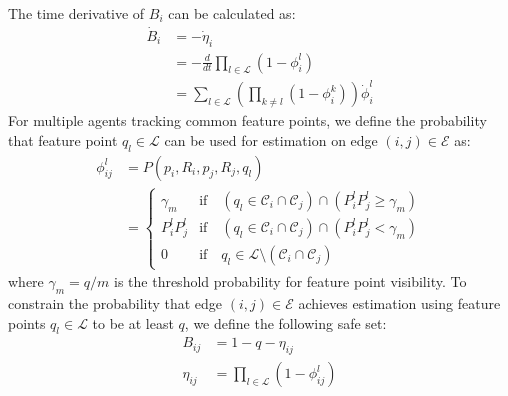 \documentclass[fleqn,10pt,twocolumn]{SICE_FES25}
\theoremstyle{definition}
\theoremstyle{plain}
\begin{document}
The time derivative of $B_i$ can be calculated as:
\begin{equation}
\begin{aligned}
\dot{B}_i &= -\dot{\eta}_i \\
&= -\frac{d}{dt}\prod_{l \in \mathcal{L}}(1 - \phi_i^l) \\
&= \sum_{l \in \mathcal{L}}\left(\prod_{k \neq l}(1 - \phi_i^k)\right)\dot{\phi}_i^l
\label{eq:multi_cbf_derivative}
\end{aligned}
\end{equation}
For multiple agents tracking common feature points, we define the probability that feature point $q_l \in \mathcal{L}$ can be used for estimation on edge $(i,j) \in \mathcal{E}$ as:
\begin{equation}
\begin{aligned}
\phi_{ij}^l &= P(p_i, R_i, p_j, R_j, q_l)\\
 &= 
\begin{cases}
\gamma_m & {\mathrm{if}}  \quad  (q_l\in{\mathcal{C}}_i \cap {\mathcal{C}}_j)
\cap (P_i^lP_j^l \ge \gamma_m)\\
P_i^lP_j^l & {\mathrm{if}}  \quad  (q_l\in{\mathcal{C}}_i \cap {\mathcal{C}}_j)
\cap (P_i^lP_j^l < \gamma_m) \\
0 & {\mathrm{if}}  \quad  q_l \in {\mathcal{L}} \setminus ({\mathcal{C}}_i \cap {\mathcal{C}}_j)
\end{cases}
\label{eq:common_probability}
\end{aligned}
\end{equation}
where $\gamma_m = q/m$ is the threshold probability for feature point visibility.
To constrain the probability that edge $(i,j) \in \mathcal{E}$ achieves estimation using feature points $q_l \in \mathcal{L}$ to be at least $q$, we define the following safe set:
\begin{equation}
\begin{aligned}
B_{ij} &= 1 - q - \eta_{ij} \\
\eta_{ij} &= \prod_{l \in \mathcal{L}} (1 - \phi_{ij}^l)
\label{eq:common_safe_set}
\end{aligned}
\end{equation}
\end{document}
